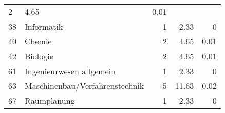 \begin{longtable}{lXrrr}
       \num{2} &
       \num[round-mode=places,round-precision=2]{4,65} &
         \num[round-mode=places,round-precision=2]{0,01} \\

     38 &
     \multicolumn{1}{X}{ Informatik   } &


       \num{1} &
       \num[round-mode=places,round-precision=2]{2,33} &
         \num[round-mode=places,round-precision=2]{0} \\

     40 &
     \multicolumn{1}{X}{ Chemie   } &


       \num{2} &
       \num[round-mode=places,round-precision=2]{4,65} &
         \num[round-mode=places,round-precision=2]{0,01} \\

     42 &
     \multicolumn{1}{X}{ Biologie   } &


       \num{2} &
       \num[round-mode=places,round-precision=2]{4,65} &
         \num[round-mode=places,round-precision=2]{0,01} \\

     61 &
     \multicolumn{1}{X}{ Ingenieurwesen allgemein   } &


       \num{1} &
       \num[round-mode=places,round-precision=2]{2,33} &
         \num[round-mode=places,round-precision=2]{0} \\

     63 &
     \multicolumn{1}{X}{ Maschinenbau/Verfahrenstechnik   } &


       \num{5} &
       \num[round-mode=places,round-precision=2]{11,63} &
         \num[round-mode=places,round-precision=2]{0,02} \\

     67 &
     \multicolumn{1}{X}{ Raumplanung   } &


       \num{1} &
       \num[round-mode=places,round-precision=2]{2,33} &
         \num[round-mode=places,round-precision=2]{0} \\


\end{longtable}
